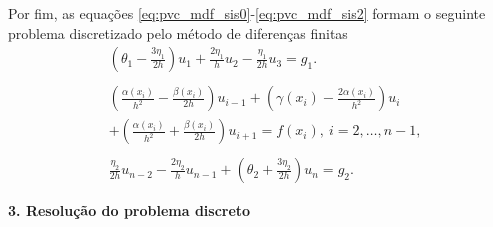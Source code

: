 Por fim, as equações \eqref{eq:pvc_mdf_sis0}-\eqref{eq:pvc_mdf_sis2} formam o seguinte problema discretizado pelo método de diferenças finitas
\begin{align}
  &\left(\theta_1 - \frac{3\eta_1}{2h}\right)u_1 + \frac{2\eta_1}{h}u_2 - \frac{\eta_1}{2h}u_3 = g_1.\label{eq:pvc_mdf_bc1}\\
  &~\nonumber\\
  &\left(\frac{\alpha(x_i)}{h^2}-\frac{\beta(x_i)}{2h}\right)u_{i-1} + \left(\gamma(x_i) - \frac{2\alpha(x_i)}{h^2}\right)u_i \nonumber \\
  &+ \left(\frac{\alpha(x_i)}{h^2}+\frac{\beta(x_i)}{2h}\right)u_{i+1} = f(x_i),~i=2, \dotsc, n-1, \label{eq:pvc_mdf_eq}\\
  &~\nonumber\\
  &\frac{\eta_2}{2h}u_{n-2} - \frac{2\eta_2}{h}u_{n-1} + \left(\theta_2 + \frac{3\eta_2}{2h}\right)u_n = g_2.\label{eq:pvc_mdf_bc2}
\end{align}

\begin{flushleft}
  {\bf 3. Resolução do problema discreto}
\end{flushleft}

